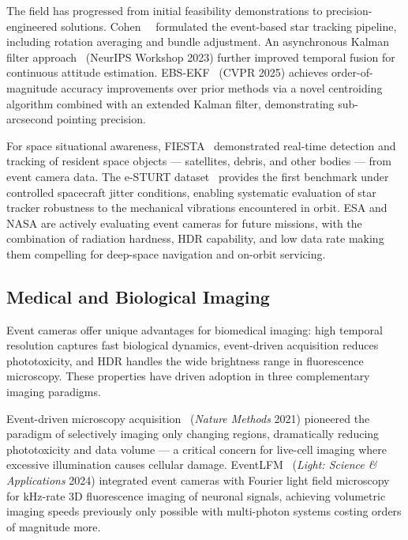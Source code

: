 The field has progressed from initial feasibility demonstrations to precision-engineered solutions. Cohen~\etal~\cite{cohen2019startracking} formulated the event-based star tracking pipeline, including rotation averaging and bundle adjustment. An asynchronous Kalman filter approach~\cite{afshar2023asynckalman} (NeurIPS Workshop 2023) further improved temporal fusion for continuous attitude estimation. EBS-EKF~\cite{liu2025ebsekf} (CVPR 2025) achieves order-of-magnitude accuracy improvements over prior methods via a novel centroiding algorithm combined with an extended Kalman filter, demonstrating sub-arcsecond pointing precision.

For space situational awareness, FIESTA~\cite{ralph2022fiesta} demonstrated real-time detection and tracking of resident space objects --- satellites, debris, and other bodies --- from event camera data. The e-STURT dataset~\cite{chin2025esturt} provides the first benchmark under controlled spacecraft jitter conditions, enabling systematic evaluation of star tracker robustness to the mechanical vibrations encountered in orbit. ESA and NASA are actively evaluating event cameras for future missions, with the combination of radiation hardness, HDR capability, and low data rate making them compelling for deep-space navigation and on-orbit servicing.


\subsection{Medical and Biological Imaging}
\label{sec:appl_medical}

Event cameras offer unique advantages for biomedical imaging: high temporal resolution captures fast biological dynamics, event-driven acquisition reduces phototoxicity, and HDR handles the wide brightness range in fluorescence microscopy. These properties have driven adoption in three complementary imaging paradigms.

Event-driven microscopy acquisition~\cite{wang2021microscopy} (\textit{Nature Methods} 2021) pioneered the paradigm of selectively imaging only changing regions, dramatically reducing phototoxicity and data volume --- a critical concern for live-cell imaging where excessive illumination causes cellular damage. EventLFM~\cite{li2024eventlfm} (\textit{Light: Science \& Applications} 2024) integrated event cameras with Fourier light field microscopy for kHz-rate 3D fluorescence imaging of neuronal signals, achieving volumetric imaging speeds previously only possible with multi-photon systems costing orders of magnitude more.

